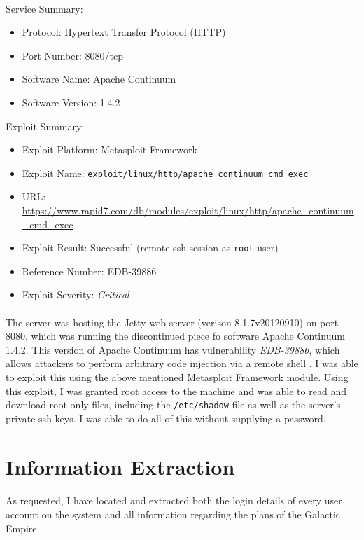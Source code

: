 \documentclass{article}
\begin{document}
\paragraph{}
Service Summary:
\begin{itemize}
	\item Protocol: Hypertext Transfer Protocol (HTTP)
	\item Port Number: 8080/tcp
	\item Software Name: Apache Continuum
	\item Software Version: 1.4.2
\end{itemize}
Exploit Summary:
\begin{itemize}
	\item Exploit Platform: Metasploit Framework
	\item Exploit Name: \texttt{exploit/linux/http/apache\_continuum\_cmd\_exec}
	\item URL: \url{https://www.rapid7.com/db/modules/exploit/linux/http/apache\_continuum\_cmd\_exec}
	\item Exploit Result: Successful (remote ssh session as \texttt{root} user)
	\item Reference Number: EDB-39886
	\item Exploit Severity: \emph{Critical}
\end{itemize}

\paragraph{}
The server was hosting the Jetty web server (verison 8.1.7v20120910) on port 8080, which was running the discontinued piece fo software Apache Continuum 1.4.2.
This version of Apache Continuum has vulnerability \emph{EDB-39886}, which allows attackers to perform arbitrary code injection via a remote shell \parencite{exploitdb39886}.
I was able to exploit this using the above mentioned Metasploit Framework module.
Using this exploit, I was granted root access to the machine and was able to read and download root-only files, including the \texttt{/etc/shadow} file as well as the server's private ssh keys.
I was able to do all of this without supplying a password.

\newpage

\section{Information Extraction}
\label{sec:info_extraction}
\paragraph{}
As requested, I have located and extracted both the login details of every user account on the system and all information regarding the plans of the Galactic Empire.
\end{document}
